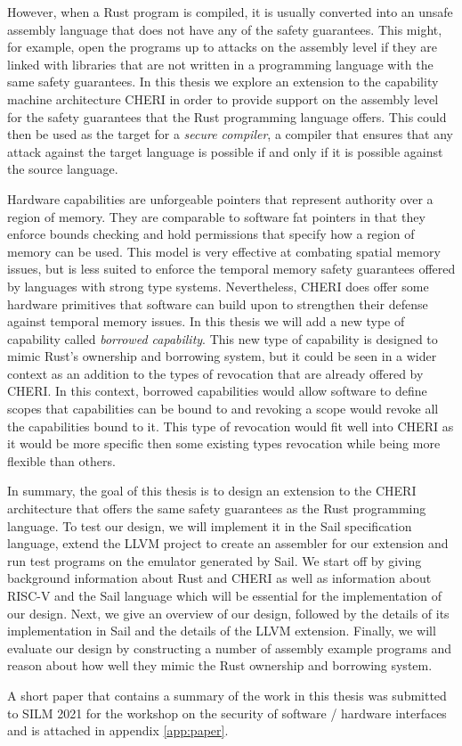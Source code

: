 However, when a Rust program is compiled, it is usually converted into an unsafe assembly language that does not have any of the safety guarantees.
This might, for example, open the programs up to attacks on the assembly level if they are linked with libraries that are not written in a programming language with the same safety guarantees.
In this thesis we explore an extension to the capability machine architecture CHERI in order to provide support on the assembly level for the safety guarantees that the Rust programming language offers.
This could then be used as the target for a \textit{secure compiler}, a compiler that ensures that any attack against the target language is possible if and only if it is possible against the source language.

Hardware capabilities are unforgeable pointers that represent authority over a region of memory.
They are comparable to software fat pointers in that they enforce bounds checking and hold permissions that specify how a region of memory can be used.
This model is very effective at combating spatial memory issues, but is less suited to enforce the temporal memory safety guarantees offered by languages with strong type systems.
Nevertheless, CHERI does offer some hardware primitives that software can build upon to strengthen their defense against temporal memory issues.
In this thesis we will add a new type of capability called \textit{borrowed capability}.
This new type of capability is designed to mimic Rust's ownership and borrowing system, but it could be seen in a wider context as an addition to the types of revocation that are already offered by CHERI.
In this context, borrowed capabilities would allow software to define scopes that capabilities can be bound to and revoking a scope would revoke all the capabilities bound to it.
This type of revocation would fit well into CHERI as it would be more specific then some existing types revocation while being more flexible than others.

In summary, the goal of this thesis is to design an extension to the CHERI architecture that offers the same safety guarantees as the Rust programming language.
To test our design, we will implement it in the Sail specification language, extend the LLVM project to create an assembler for our extension and run test programs on the emulator generated by Sail.
We start off by giving background information about Rust and CHERI as well as information about RISC-V and the Sail language which will be essential for the implementation of our design.
Next, we give an overview of our design, followed by the details of its implementation in Sail and the details of the LLVM extension.
Finally, we will evaluate our design by constructing a number of assembly example programs and reason about how well they mimic the Rust ownership and borrowing system.

A short paper that contains a summary of the work in this thesis was submitted to SILM 2021 for the workshop on the security of software / hardware interfaces and is attached in appendix \ref{app:paper}.

